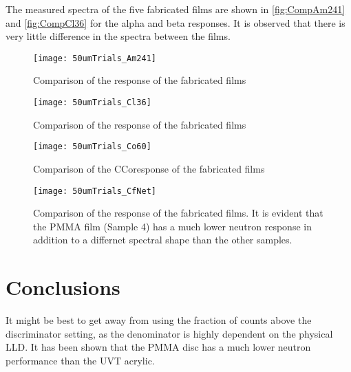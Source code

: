 \documentclass[draftcls,onecolumn]{IEEEtran}
\begin{document}
The measured spectra of the five fabricated films are shown in \autoref{fig:CompAm241} and \autoref{fig:CompCl36} for the alpha and beta responses.
It is observed that there is very little difference in the spectra between the films.
\begin{figure}
  \centering
  \texttt{[image: 50umTrials\_Am241]}
  \caption[Fabricated Film Comparison (Alpha)]{Comparison of the  response of the fabricated films}
  \label{fig:CompAm241}
\end{figure}
\begin{figure}
  \centering
  \texttt{[image: 50umTrials\_Cl36]}
  \caption[Fabricated Film Comparison (Beta)]{Comparison of the  response of the fabricated films}
  \label{fig:CompCl36}
\end{figure}
\begin{figure}
  \centering
  \texttt{[image: 50umTrials\_Co60]}
  \caption[Fabricated Film Comparison (Gamma)]{Comparison of the \iso[60]C{Co}response of the fabricated films}
  \label{fig:CompCo60}
\end{figure}
\begin{figure}
  \centering
  \texttt{[image: 50umTrials\_CfNet]}
  \caption[Fabricated Film Comparison (Neutron)]{Comparison of the  response of the fabricated films. It is evident that the PMMA film (Sample 4) has a much lower neutron response in addition to a differnet spectral shape than the other samples.}
  \label{fig:CompCf252}
\end{figure}
\section{Conclusions}

It might be best to get away from using the fraction of counts above the discriminator setting, as the denominator is highly dependent on the physical LLD.
It has been shown that the PMMA disc has a much lower neutron performance than the UVT acrylic.

\pagebreak
\appendix
\end{document}
